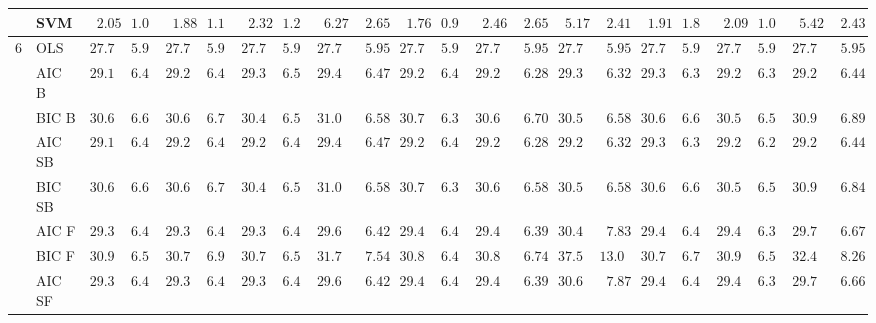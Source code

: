 \begin{tabular}{ll|ll|llllll|llllll|llllll}
 & SVM  & $\phantom{0}2.05$ & $1.03$ & $\phantom{0}1.88$ & $1.17$ & $\phantom{0}2.32$ & $1.24$ & $\phantom{0}6.27$ & $\phantom{0}2.65$ & $\phantom{0}1.76$ & $0.91$ & $\phantom{0}2.46$ & $\phantom{0}2.65$ & $\phantom{0}5.17$ & $\phantom{0}2.41$ & $\phantom{0}1.91$ & $1.83$ & $\phantom{0}2.09$ & $1.01$ & $\phantom{0}5.42$ & $\phantom{0}2.43$ \\\hline
6 & OLS  & $27.74$ & $5.95$ & $27.74$ & $5.95$ & $27.74$ & $5.95$ & $27.74$ & $\phantom{0}5.95$ & $27.74$ & $5.95$ & $27.74$ & $\phantom{0}5.95$ & $27.74$ & $\phantom{0}5.95$ & $27.74$ & $5.95$ & $27.74$ & $5.95$ & $27.74$ & $\phantom{0}5.95$ \\
 & AIC B  & $29.19$ & $6.40$ & $29.26$ & $6.44$ & $29.31$ & $6.51$ & $29.40$ & $\phantom{0}6.47$ & $29.25$ & $6.45$ & $29.29$ & $\phantom{0}6.28$ & $29.30$ & $\phantom{0}6.32$ & $29.33$ & $6.35$ & $29.25$ & $6.30$ & $29.23$ & $\phantom{0}6.44$ \\
 & BIC B  & $30.68$ & $6.62$ & $30.64$ & $6.76$ & $30.47$ & $6.53$ & $31.01$ & $\phantom{0}6.58$ & $30.70$ & $6.35$ & $30.64$ & $\phantom{0}6.70$ & $30.59$ & $\phantom{0}6.58$ & $30.67$ & $6.63$ & $30.51$ & $6.54$ & $30.97$ & $\phantom{0}6.89$ \\
 & AIC SB  & $29.19$ & $6.40$ & $29.25$ & $6.43$ & $29.29$ & $6.48$ & $29.40$ & $\phantom{0}6.47$ & $29.25$ & $6.45$ & $29.29$ & $\phantom{0}6.28$ & $29.29$ & $\phantom{0}6.32$ & $29.33$ & $6.35$ & $29.21$ & $6.27$ & $29.23$ & $\phantom{0}6.44$ \\
 & BIC SB  & $30.68$ & $6.62$ & $30.62$ & $6.79$ & $30.47$ & $6.53$ & $31.01$ & $\phantom{0}6.58$ & $30.70$ & $6.35$ & $30.60$ & $\phantom{0}6.58$ & $30.59$ & $\phantom{0}6.58$ & $30.67$ & $6.63$ & $30.51$ & $6.54$ & $30.93$ & $\phantom{0}6.84$ \\
 & AIC F  & $29.31$ & $6.41$ & $29.36$ & $6.43$ & $29.38$ & $6.45$ & $29.65$ & $\phantom{0}6.42$ & $29.48$ & $6.45$ & $29.40$ & $\phantom{0}6.39$ & $30.49$ & $\phantom{0}7.83$ & $29.47$ & $6.41$ & $29.43$ & $6.31$ & $29.77$ & $\phantom{0}6.67$ \\
 & BIC F  & $30.94$ & $6.56$ & $30.76$ & $6.90$ & $30.74$ & $6.53$ & $31.79$ & $\phantom{0}7.54$ & $30.87$ & $6.45$ & $30.87$ & $\phantom{0}6.74$ & $37.59$ & $13.09$ & $30.74$ & $6.72$ & $30.92$ & $6.56$ & $32.43$ & $\phantom{0}8.26$ \\
 & AIC SF  & $29.31$ & $6.41$ & $29.36$ & $6.43$ & $29.38$ & $6.45$ & $29.65$ & $\phantom{0}6.42$ & $29.48$ & $6.44$ & $29.41$ & $\phantom{0}6.39$ & $30.60$ & $\phantom{0}7.87$ & $29.47$ & $6.41$ & $29.44$ & $6.31$ & $29.77$ & $\phantom{0}6.66$ \\

\end{tabular}
